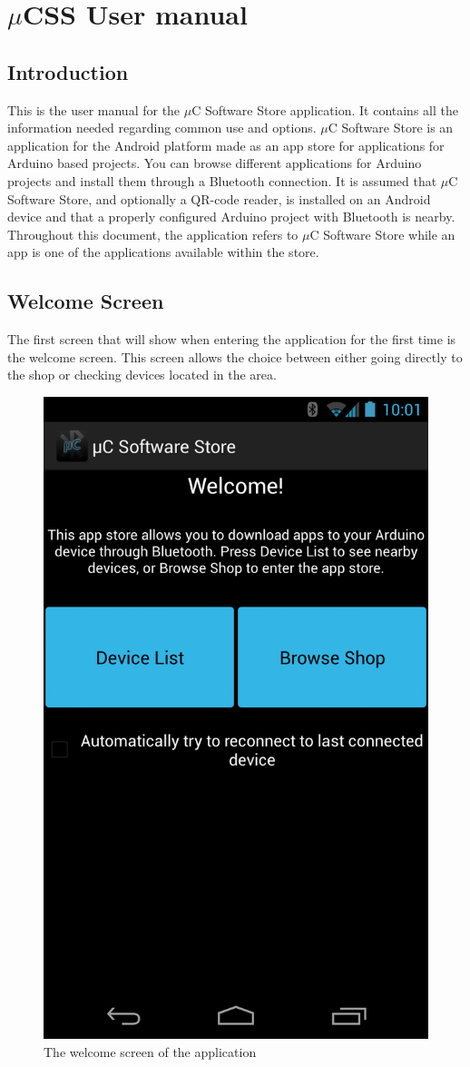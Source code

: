 \chapter{$\mu$CSS User manual}
	\section{Introduction}
		This is the user manual for the $\mu$C Software Store application. It contains all the information needed regarding common use and options. $\mu$C Software Store is an application for the Android platform made as an app store for applications for Arduino based projects. You can browse different applications for Arduino projects and install them through a Bluetooth connection. It is assumed that $\mu$C Software Store, and optionally a QR-code reader, is installed on an Android device and that a properly configured Arduino project with Bluetooth is nearby.\\
		\newline
		Throughout this document, the application refers to $\mu$C Software Store while an app is one of the applications available within the store.
		\newpage
	\section{Welcome Screen}
		The first screen that will show when entering the application for the first time is the welcome screen. This screen allows the choice between either going directly to the shop or checking devices located in the area. \\
		\newline
		\begin{figure}[H]
			\centering
			\includegraphics[width=0.5 \textwidth]{images/Screenshots/welcome_screen.png}
			\caption{The welcome screen of the application}
		\end{figure}

